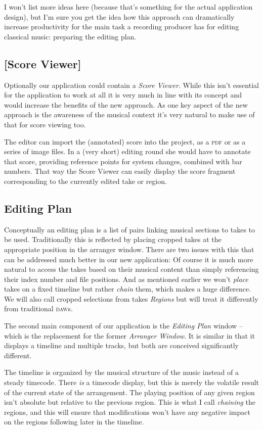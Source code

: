 \documentclass[11pt,a4paper]{article}
\begin{document}
I won't list more ideas here (because that's something for the actual
application design), but I'm sure you get the idea how this approach can
dramatically increase productivity for the main task a recording producer has
for editing classical music: preparing the editing plan.

\subsection{[Score Viewer]}
Optionally our application could contain a \emph{Score Viewer}.
While this isn't essential for the application to work at all it is very much in
line with its concept and would increase the benefits of the new approach.
As one key aspect of the new approach is the awareness of the musical context
it's very natural to make use of that for score viewing too.

The editor can import the (annotated) score into the project, as a \textsc{pdf} or as a
series of image files.
In a (very short) editing round she would have to annotate that score, providing
reference points for system changes, combined with bar numbers.
That way the Score Viewer can easily display the score fragment corresponding to
the currently edited take or region.

\subsection{Editing Plan}
Conceptually an editing plan is a list of pairs linking musical sections to
takes to be used.
Traditionally this is reflected by placing cropped takes at the appropriate
position in the arranger window.
There are two issues with this that can be addressed much better in our new
application:
Of course it is much more natural to access the takes based on their musical
content than simply referencing their index number and file positions.
And as mentioned earlier we won't \emph{place} takes on a fixed timeline but
rather \emph{chain} them, which makes a huge difference.
We will also call cropped selections from takes \emph{Regions} but will treat it
differently from traditional \textsc{daw}s.

\medskip
The second main component of our application is the \emph{Editing Plan} window
-- which is the replacement for the former \emph{Arranger Window}.
It is similar in that it displays a timeline and multiple tracks, but both are
conceived significantly different.

The timeline is organized by the musical structure of the music instead of a
steady timecode.
There \emph{is} a timecode display, but this is merely the volatile result of
the current state of the arrangement.
The playing position of any given region isn't absolute but relative to the
previous region.
This is what I call \emph{chaining} the regions, and this will ensure that
modifications won't have any negative impact on the regions following later in
the timeline.
\end{document}
